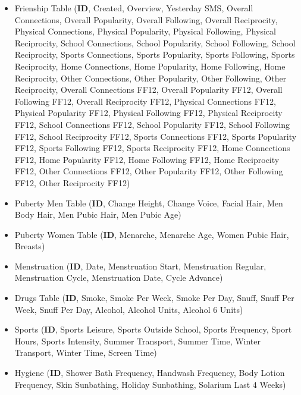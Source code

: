\begin{sloppypar}
\begin{itemize}
    \item {Frienship Table} (\textbf{ID}, Created, Overview, Yesterday SMS, Overall Connections, Overall Popularity, Overall Following, Overall Reciprocity, Physical Connections, Physical Popularity, Physical Following, Physical Reciprocity, School Connections, School Popularity, School Following, School Reciprocity, Sports Connections, Sports Popularity, Sports Following, Sports Reciprocity, Home Connections, Home Popularity, Home Following, Home Reciprocity, Other Connections, Other Popularity, Other Following, Other Reciprocity, Overall Connections FF12, Overall Popularity FF12, Overall Following FF12, Overall Reciprocity FF12, Physical Connections FF12, Physical Popularity FF12, Physical Following FF12, Physical Reciprocity FF12, School Connections FF12, School Popularity FF12, School Following FF12, School Reciprocity FF12, Sports Connections FF12, Sports Popularity FF12, Sports Following FF12, Sports Reciprocity FF12, Home Connections FF12, Home Popularity FF12, Home Following FF12, Home Reciprocity FF12, Other Connections FF12, Other Popularity FF12, Other Following FF12, Other Reciprocity FF12)
    
    \item {Puberty Men Table} (\textbf{ID}, Change Height, Change Voice, Facial Hair, Men Body Hair, Men Pubic Hair, Men Pubic Age)
    
    \item {Puberty Women Table} (\textbf{ID}, Menarche, Menarche Age, Women Pubic Hair, Breasts)

    \item {Menstruation} (\textbf{ID}, Date, Menstruation Start, Menstruation Regular, Menstruation Cycle, Menstruation Date, Cycle Advance)
    
    \item {Drugs Table} (\textbf{ID}, Smoke, Smoke Per Week, Smoke Per Day, Snuff, Snuff Per Week, Snuff Per Day, Alcohol, Alcohol Units, Alcohol 6 Units)

    \item {Sports} (\textbf{ID}, Sports Leisure, Sports Outside School, Sports Frequency, Sport Hours, Sports Intensity, Summer Transport, Summer Time, Winter Transport, Winter Time, Screen Time)
    
    \item {Hygiene} (\textbf{ID}, Shower Bath Frequency, Handwash Frequency, Body Lotion Frequency, Skin Sunbathing, Holiday Sunbathing, Solarium Last 4 Weeks) 
    

\end{itemize}
\end{sloppypar}
